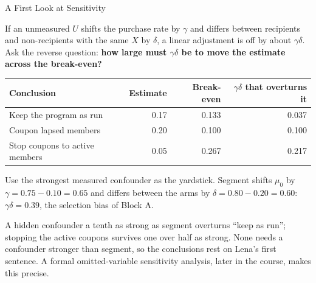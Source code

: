 \documentclass[aspectratio=169, 11pt, handout]{beamer}
\begin{document}
\begin{frame}{A First Look at Sensitivity}

If an unmeasured $U$ shifts the purchase rate by $\gamma$ and differs between recipients and non-recipients with the same $X$ by $\delta$, a linear adjustment is off by about $\gamma\delta$. Ask the reverse question: \textbf{how large must $\gamma\delta$ be to move the estimate across the break-even?}

\begin{center}
\small
\begin{tabular}{lrrr}
\toprule
\textbf{Conclusion} & \textbf{Estimate} & \textbf{Break-even} & \textbf{$\gamma\delta$ that overturns it} \\
\midrule
Keep the program as run & 0.17 & 0.133 & 0.037 \\
Coupon lapsed members & 0.20 & 0.100 & 0.100 \\
Stop coupons to active members & 0.05 & 0.267 & 0.217 \\
\bottomrule
\end{tabular}
\end{center}

Use the strongest measured confounder as the yardstick. Segment shifts $\mu_0$ by $\gamma = 0.75 - 0.10 = 0.65$ and differs between the arms by $\delta = 0.80 - 0.20 = 0.60$: $\gamma\delta = 0.39$, the selection bias of Block A.

\medskip

A hidden confounder a tenth as strong as segment overturns ``keep as run''; stopping the active coupons survives one over half as strong. None needs a confounder stronger than segment, so the conclusions rest on Lena's first sentence. A formal omitted-variable sensitivity analysis, later in the course, makes this precise.
\end{frame}
\end{document}
